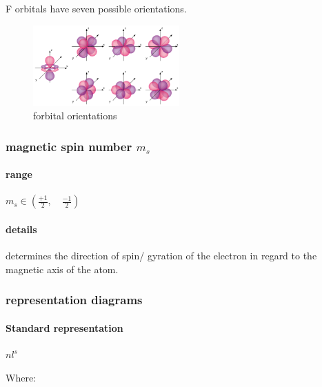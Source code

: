 \documentclass[]{article}
\let\oldparagraph\paragraph
\renewcommand{\paragraph}[1]{\oldparagraph{#1}\mbox{}}
\begin{document}
F orbitals have seven possible orientations.

\begin{figure}
\centering
\includegraphics[width=0.5\textwidth,height=\textheight]{Images/fOrbitalOrientations.png}
\caption{forbital orientations}
\end{figure}

\hypertarget{magnetic-spin-number-m_s}{%
\subsubsection{\texorpdfstring{magnetic spin number
\(m_{s}\)}{magnetic spin number m\_\{s\}}}\label{magnetic-spin-number-m_s}}

\hypertarget{range-3}{%
\paragraph{range}\label{range-3}}

\(m_{s} \in \left( \frac{+1}{2},\quad\frac{-1}{2} \right)\)

\hypertarget{details-3}{%
\paragraph{details}\label{details-3}}

determines the direction of spin/ gyration of the electron in regard to
the magnetic axis of the atom.

\hypertarget{representation-diagrams}{%
\subsubsection{representation diagrams}\label{representation-diagrams}}

\hypertarget{standard-representation}{%
\paragraph{Standard representation}\label{standard-representation}}

\(nl^{s}\)

Where:
\end{document}
